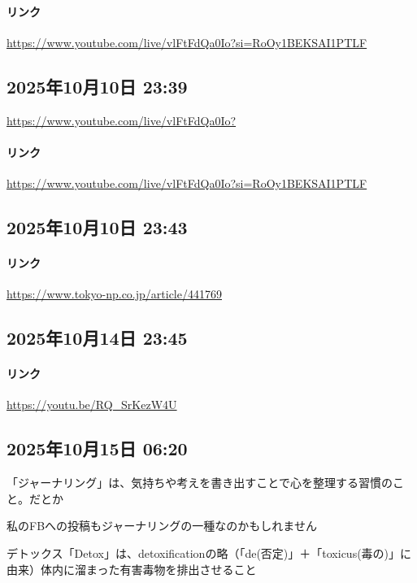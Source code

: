 \paragraph{リンク}
\url{https://www.youtube.com/live/vlFtFdQa0Io?si=RoOy1BEKSAI1PTLF}

\subsection*{2025年10月10日 23:39}

\url{https://www.youtube.com/live/vlFtFdQa0Io?}

\paragraph{リンク}
\url{https://www.youtube.com/live/vlFtFdQa0Io?si=RoOy1BEKSAI1PTLF}

\subsection*{2025年10月10日 23:43}

\paragraph{リンク}
\url{https://www.tokyo-np.co.jp/article/441769}

\subsection*{2025年10月14日 23:45}

\paragraph{リンク}
\url{https://youtu.be/RQ_SrKezW4U}

\subsection*{2025年10月15日 06:20}

「ジャーナリング」は、気持ちや考えを書き出すことで心を整理する習慣のこと。だとか

私のFBへの投稿もジャーナリングの一種なのかもしれません

デトックス「Detox」は、detoxificationの略（「de(否定)」＋「toxicus(毒の)」に由来）体内に溜まった有害毒物を排出させること

